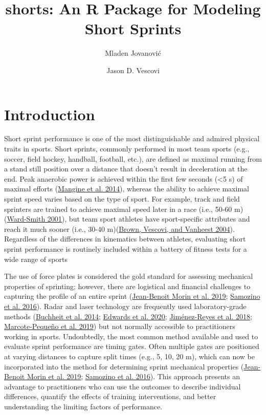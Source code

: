 \documentclass[fleqn,10pt,lineno]{wlpeerj} %
\title{shorts: An R Package for Modeling Short Sprints}
\author[1]{Mladen Jovanović}
\author[2]{Jason D. Vescovi}
\affil[1]{Faculty of Sport and Physical Education, University of Belgrade, Serbia}
\affil[2]{Faculty of Kinesiology and Physical Education, Graduate School of Exercise Science, Toronto, ON Canada}
\begin{document}
\flushbottom
\maketitle
\thispagestyle{empty}

\hypertarget{introduction}{%
\section{Introduction}\label{introduction}}

Short sprint performance is one of the most distinguishable and admired physical traits in sports. Short sprints, commonly performed in most team sports (e.g., soccer, field hockey, handball, football, etc.), are defined as maximal running from a stand still position over a distance that doesn't result in deceleration at the end. Peak anaerobic power is achieved within the first few seconds (\textless5 s) of maximal efforts (\protect\hyperlink{ref-mangineSpeedForcePower2014}{Mangine et al. 2014}), whereas the ability to achieve maximal sprint speed varies based on the type of sport. For example, track and field sprinters are trained to achieve maximal speed later in a race (i.e., 50-60 m) (\protect\hyperlink{ref-ward-smithEnergyConversionStrategies2001}{Ward-Smith 2001}), but team sport athletes have sport-specific attributes and reach it much sooner (i.e., 30-40 m)(\protect\hyperlink{ref-brownAssessmentLinearSprinting2004}{Brown, Vescovi, and Vanheest 2004}). Regardless of the differences in kinematics between athletes, evaluating short sprint performance is routinely included within a battery of fitness tests for a wide range of sports

The use of force plates is considered the gold standard for assessing mechanical properties of sprinting; however, there are logistical and financial challenges to capturing the profile of an entire sprint (\protect\hyperlink{ref-morinSimpleMethodComputing2019}{Jean-Benoit Morin et al. 2019}; \protect\hyperlink{ref-samozinoSimpleMethodMeasuring2016}{Samozino et al. 2016}). Radar and laser technology are frequently used laboratory-grade methods (\protect\hyperlink{ref-buchheitMechanicalDeterminantsAcceleration2014}{Buchheit et al. 2014}; \protect\hyperlink{ref-edwardsSprintAccelerationCharacteristics2020}{Edwards et al. 2020}; \protect\hyperlink{ref-jimenez-reyesRelationshipVerticalHorizontal2018}{Jiménez-Reyes et al. 2018}; \protect\hyperlink{ref-marcote-pequenoAssociationForceVelocity2019}{Marcote-Pequeño et al. 2019}) but not normally accessible to practitioners working in sports. Undoubtedly, the most common method available and used to evaluate sprint performance are timing gates. Often multiple gates are positioned at varying distances to capture split times (e.g., 5, 10, 20 m), which can now be incorporated into the method for determining sprint mechanical properties (\protect\hyperlink{ref-morinSimpleMethodComputing2019}{Jean-Benoit Morin et al. 2019}; \protect\hyperlink{ref-samozinoSimpleMethodMeasuring2016}{Samozino et al. 2016}). This approach presents an advantage to practitioners who can use the outcomes to describe individual differences, quantify the effects of training interventions, and better understanding the limiting factors of performance.
\end{document}

